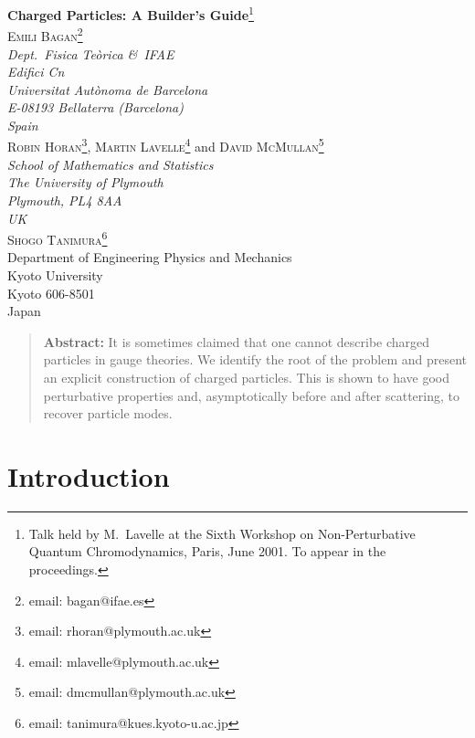 \documentclass[12pt,a4paper]{article}
\begin{document}
\begin{titlepage}
%
%
%
\begin{center}{\Large{\textbf{Charged Particles: A Builder's Guide}}\footnote{Talk held by M.~Lavelle
at the Sixth Workshop on Non-Perturbative Quantum Chromodynamics,
Paris, June 2001. To appear in the proceedings.}}\\ [12truemm]
\textsc{Emili Bagan}\footnote{email: bagan@ifae.es}\\
[5truemm] \textit{Dept.~Fisica Te\`orica \&\ IFAE\\
Edifici Cn\\
Universitat Aut\`onoma de Barcelona\\E-08193 Bellaterra  (Barcelona)\\
Spain\\[5truemm]}
\textsc{Robin Horan\footnote{email: rhoran@plymouth.ac.uk}, Martin
Lavelle}\footnote{email: mlavelle@plymouth.ac.uk} and
\textsc{David McMullan}\footnote{email: dmcmullan@plymouth.ac.uk}\\
[5truemm] \textit{School of Mathematics and Statistics\\ The
University of Plymouth\\ Plymouth, PL4 8AA\\ UK}
\\[5truemm]
\textsc{Shogo Tanimura}\footnote{email:
tanimura@kues.kyoto-u.ac.jp}\\[5truemm]
Department of Engineering Physics and Mechanics\\
Kyoto University\\
Kyoto 606-8501\\
Japan
\end{center}


\bigskip\bigskip\bigskip
\begin{quote}
\textbf{Abstract:} It is sometimes claimed that one cannot
describe charged particles in gauge theories. We identify the
root of the problem and present an explicit construction of
charged particles. This is shown to have good perturbative
properties and, asymptotically before and after scattering, to
recover particle modes.
\end{quote}



\end{titlepage}



\setlength{\parskip}{1.5ex plus 0.5ex minus 0.5ex}


\section*{Introduction}
\end{document}
